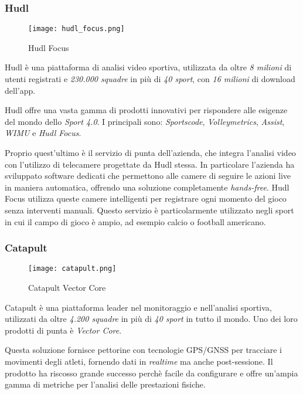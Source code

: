 \subsubsection{Hudl}
\label{subsubsec:hudl}
\begin{wrapfigure}{r}{0.48\textwidth}
    \centering
    \texttt{[image: hudl\_focus.png]}
    \caption{Hudl Focus}
    \label{fig:Hudl Focus}
\end{wrapfigure}
Hudl \cite{Hudl} è una piattaforma di analisi video sportiva, utilizzata da oltre \textit{8 milioni} di utenti registrati e \textit{230.000 squadre} in più di \textit{40 sport}, con \textit{16 milioni} di download dell'app.

\noindent Hudl offre una vasta gamma di prodotti innovativi per rispondere alle esigenze del mondo dello \textit{Sport 4.0}. I principali sono: \textit{Sportscode}, \textit{Volleymetrics}, \textit{Assist}, \textit{WIMU} e \textit{Hudl Focus}.

\noindent Proprio quest'ultimo è il servizio di punta dell'azienda, che integra l'analisi video con l'utilizzo di telecamere progettate da Hudl stessa.  In particolare l'azienda ha sviluppato software dedicati che permettono alle camere di seguire le azioni live in maniera automatica, offrendo una soluzione completamente \textit{hands-free}. Hudl Focus utilizza queste camere intelligenti per registrare ogni momento del gioco senza interventi manuali. Questo servizio è particolarmente utilizzato negli sport in cui il campo di gioco è ampio, ad esempio calcio o football americano.




\subsubsection{Catapult}
\label{subsubsec:catapult}
\begin{wrapfigure}{r}{0.48\textwidth}
    \centering
    \vspace{-15px}
    \texttt{[image: catapult.png]}
    \caption{Catapult Vector Core}
    \label{fig:Catapult Vector Core}
\end{wrapfigure}
Catapult \cite{Catapult} è una piattaforma leader nel monitoraggio e nell'analisi sportiva, utilizzati da oltre \textit{4.200 squadre} in più di \textit{40 sport} in tutto il mondo. Uno dei loro prodotti di punta è \textit{Vector Core}.

Questa soluzione fornisce pettorine con tecnologie GPS/GNSS  per tracciare i movimenti degli atleti, fornendo dati in \textit{realtime} ma anche post-sessione. Il prodotto ha riscosso grande successo perchè facile da configurare e offre un'ampia gamma di metriche per l'analisi delle prestazioni fisiche. 


